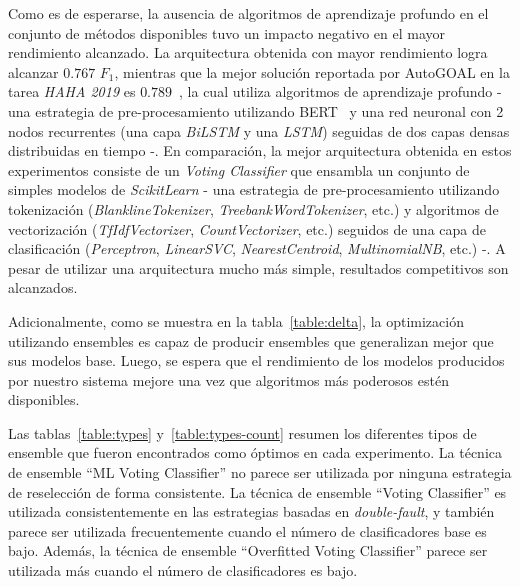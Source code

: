 Como es de esperarse, la ausencia de algoritmos de aprendizaje profundo en el conjunto de métodos disponibles tuvo un impacto negativo en el mayor rendimiento alcanzado.
La arquitectura obtenida con mayor rendimiento logra alcanzar $0.767$ $F_1$, mientras que la mejor solución reportada por AutoGOAL en la tarea \emph{HAHA 2019} es $0.789$~\parencite{estevez2020automatic}, la cual utiliza algoritmos de aprendizaje profundo - una estrategia de pre-procesamiento utilizando BERT~\parencite{devlin2018bert} y una red neuronal con 2 nodos recurrentes (una capa \emph{BiLSTM} y una \emph{LSTM}) seguidas de dos capas densas distribuidas en tiempo -.
En comparación, la mejor arquitectura obtenida en estos experimentos consiste de un \emph{Voting Classifier} que ensambla un conjunto de simples modelos de \emph{ScikitLearn} - una estrategia de pre-procesamiento utilizando tokenización (\emph{BlanklineTokenizer}, \emph{TreebankWordTokenizer}, etc.) y algoritmos de vectorización (\emph{TfIdfVectorizer}, \emph{CountVectorizer}, etc.) seguidos de una capa de clasificación (\emph{Perceptron}, \emph{LinearSVC}, \emph{NearestCentroid}, \emph{MultinomialNB}, etc.) -.
A pesar de utilizar una arquitectura mucho más simple, resultados competitivos son alcanzados.

Adicionalmente, como se muestra en la tabla~\ref{table:delta}, la optimización utilizando ensembles es capaz de producir ensembles que generalizan mejor que sus modelos base.
Luego, se espera que el rendimiento de los modelos producidos por nuestro sistema mejore una vez que algoritmos más poderosos estén disponibles.

Las tablas~\ref{table:types} y~\ref{table:types-count} resumen los diferentes tipos de ensemble que fueron encontrados como óptimos en cada experimento.
La técnica de ensemble ``ML Voting Classifier'' no parece ser utilizada por ninguna estrategia de reselección de forma consistente.
La técnica de ensemble ``Voting Classifier'' es utilizada consistentemente en las estrategias basadas en \emph{double-fault}, y también parece ser utilizada frecuentemente cuando el número de clasificadores base es bajo.
Además, la técnica de ensemble ``Overfitted Voting Classifier'' parece ser utilizada más cuando el número de clasificadores es bajo.

